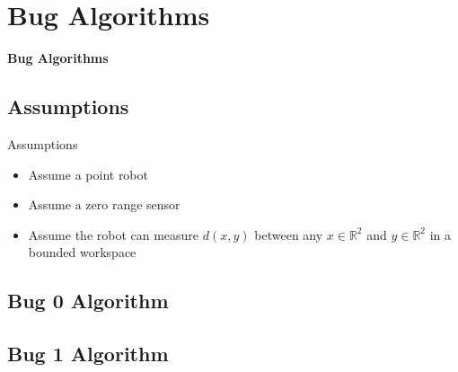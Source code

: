 \documentclass[handout]{beamer}
\begin{document}
\section[Bug Algorithms]{Bug Algorithms}

\begin{frame}
  \centering
  \textbf{Bug Algorithms}
\end{frame}

\subsection[Assumptions]{Assumptions}

\begin{frame}{Assumptions}
  \begin{itemize}
    \item Assume a point robot
    \item Assume a zero range sensor
    \item Assume the robot can measure $d(x,y)$ between any $x \in \mathbb{R}^{2} $ and $y \in \mathbb{R}^{2}$ in a bounded workspace
  \end{itemize}
\end{frame}

\subsection[Bug 0]{Bug 0 Algorithm}

\subsection[Bug 1]{Bug 1 Algorithm}
\end{document}
